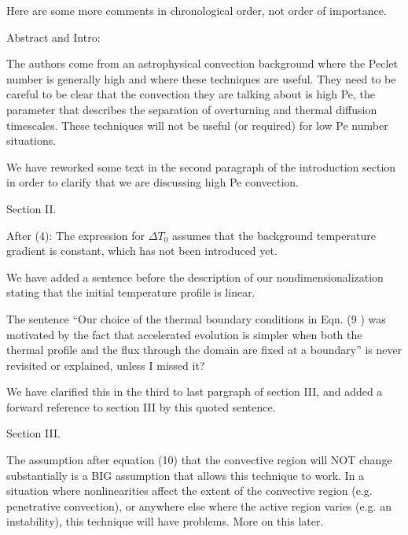\documentclass[aps, 11pt, singlecolumn]{revtex4-1} %
\begin{document}
\begin{singlespace}
\begin{myquotation}
Here are some more comments in chronological order, not order of
importance.

Abstract and Intro:

The authors come from an astrophysical convection background where the
Peclet number is generally high and where these techniques are useful.
They need to be careful to be clear that the convection they are
talking about is high Pe, the parameter that describes the separation
of overturning and thermal diffusion timescales. These techniques will
not be useful (or required) for low Pe number situations.
\end{myquotation}
We have reworked some text in the second paragraph of the introduction section
in order to clarify that we are discussing high Pe convection.

\begin{myquotation}
Section II.

After (4): The expression for $\Delta T_0$ assumes that the background
temperature gradient is constant, which has not been introduced yet.
\end{myquotation}
We have added a sentence before the description of our nondimensionalization
stating that the initial temperature profile is linear.

\begin{myquotation}
The sentence ``Our choice of the thermal boundary conditions in Eqn.
(9 ) was motivated by the fact that accelerated evolution is simpler
when both the thermal profile and the flux through the domain are
fixed at a boundary'' is never revisited or explained, unless I missed
it?
\end{myquotation}
We have clarified this in the third to last pargraph of section III,
and added a forward reference to section III by this quoted sentence. 

\begin{myquotation}
Section III.

The assumption after equation (10) that the convective region will NOT
change substantially is a BIG assumption that allows this technique to
work. In a situation where nonlinearities affect the extent of the
convective region (e.g. penetrative convection), or anywhere else
where the active region varies (e.g. an instability), this technique
will have problems. More on this later.


\end{myquotation}
\end{singlespace}
\end{document}
